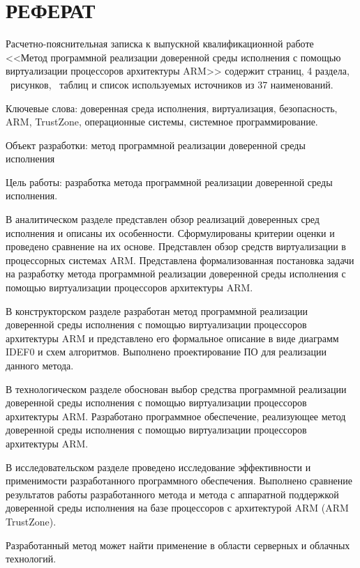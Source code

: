 \section*{РЕФЕРАТ}

Расчетно-пояснительная записка к выпускной квалификационной работе <<Метод программной реализации доверенной среды исполнения с помощью виртуализации процессоров архитектуры ARM>> содержит \pageref{LastPage} страниц, 4 раздела, \totalfigures\ рисунков, \totaltables\ таблиц и список используемых источников из 37 наименований.

Ключевые слова: доверенная среда исполнения, виртуализация, безопасность, ARM, 
TrustZone, операционные системы, системное программирование.

Объект разработки: метод программной реализации доверенной среды исполнения

Цель работы: разработка метода программной реализации доверенной среды исполнения.
 
В аналитическом разделе представлен обзор реализаций доверенных сред исполнения и описаны их особенности. Сформулированы критерии оценки и проведено сравнение на их основе. Представлен обзор средств виртуализации в процессорных системах ARM. Представлена формализованная постановка задачи на разработку метода программной реализации доверенной среды исполнения с помощью виртуализации процессоров архитектуры ARM.

В конструкторском разделе разработан метод программной реализации доверенной среды исполнения с помощью виртуализации процессоров архитектуры ARM и представлено его формальное описание в виде диаграмм IDEF0 и схем алгоритмов. Выполнено проектирование ПО для реализации данного метода.

В технологическом разделе обоснован выбор средства программной реализации доверенной среды исполнения с помощью виртуализации процессоров архитектуры ARM. Разработано программное обеспечение, реализующее метод доверенной среды исполнения с помощью виртуализации процессоров архитектуры ARM.

В исследовательском разделе проведено исследование эффективности и применимости разработанного программного обеспечения. Выполнено сравнение результатов работы разработанного метода и метода с аппаратной поддержкой доверенной среды исполнения на базе процессоров с архитектурой ARM (ARM TrustZone).

Разработанный метод может найти применение в области серверных и облачных технологий.

\pagebreak
